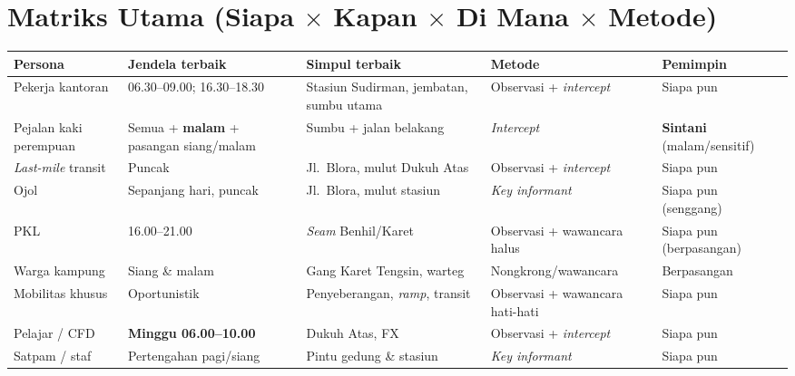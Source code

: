 \documentclass[11pt,a4paper]{report}
\begin{document}
\section{Matriks Utama (Siapa $\times$ Kapan $\times$ Di Mana $\times$ Metode)}
\begin{longtable}{@{}p{3.0cm}p{3.2cm}p{3.4cm}p{2.6cm}p{1.8cm}@{}}
\toprule
\textbf{Persona} & \textbf{Jendela terbaik} & \textbf{Simpul terbaik} & \textbf{Metode} & \textbf{Pemimpin} \\
\midrule
\endhead
Pekerja kantoran & 06.30--09.00; 16.30--18.30 & Stasiun Sudirman, jembatan, sumbu utama & Observasi + \emph{intercept} & Siapa pun \\
Pejalan kaki perempuan & Semua + \textbf{malam} + pasangan siang/malam & Sumbu + jalan belakang & \emph{Intercept} & \textbf{Sintani} (malam/sensitif) \\
\emph{Last-mile} transit & Puncak & Jl.\ Blora, mulut Dukuh Atas & Observasi + \emph{intercept} & Siapa pun \\
Ojol & Sepanjang hari, puncak & Jl.\ Blora, mulut stasiun & \emph{Key informant} & Siapa pun (senggang) \\
PKL & 16.00--21.00 & \emph{Seam} Benhil/Karet & Observasi + wawancara halus & Siapa pun (berpasangan) \\
Warga kampung & Siang \& malam & Gang Karet Tengsin, warteg & Nongkrong/wawancara & Berpasangan \\
Mobilitas khusus & Oportunistik & Penyeberangan, \emph{ramp}, transit & Observasi + wawancara hati-hati & Siapa pun \\
Pelajar / CFD & \textbf{Minggu 06.00--10.00} & Dukuh Atas, FX & Observasi + \emph{intercept} & Siapa pun \\
Satpam / staf & Pertengahan pagi/siang & Pintu gedung \& stasiun & \emph{Key informant} & Siapa pun \\
\bottomrule
\end{longtable}

\end{document}
